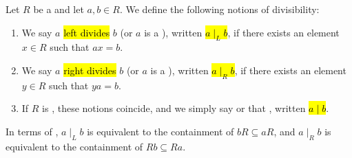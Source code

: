 \begin{definition} \label{definition:divisibility_of_elements_of_rings}
    Let $R$ be a  and let $a, b \in R$. We define the following notions of divisibility:
    \begin{enumerate}
        \item We say $a$ \hl{left divides} $b$ (or $a$ is a ), written \hl{$a \mid_L b$}, if there exists an element $x \in R$ such that $ax = b$.
        \item We say $a$ \hl{right divides} $b$ (or $a$ is a ), written \hl{$a \mid_R b$}, if there exists an element $y \in R$ such that $ya = b$.
        \item If $R$ is , these notions coincide, and we simply say  or that , written \hl{$a \mid b$}.
    \end{enumerate}
    In terms of , $a \mid_L b$ is equivalent to the containment of  $bR \subseteq aR$, and $a \mid_R b$ is equivalent to the containment of  $Rb \subseteq Ra$.
\end{definition}